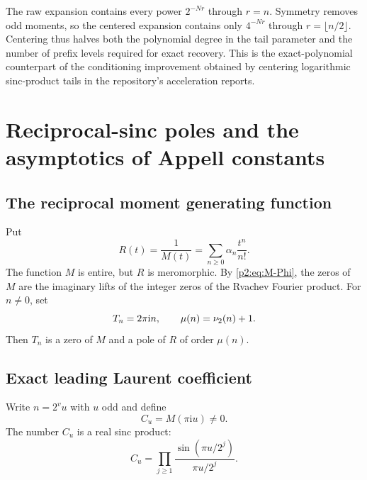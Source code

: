 \documentclass[11pt,oneside]{article}
\numberwithin{equation}{section}
\theoremstyle{definition}
\theoremstyle{remark}
\newcommand{\ii}{\mathrm i}
\begin{document}
\begin{remark}
The raw expansion contains every power $2^{-Nr}$ through $r=n$.  Symmetry removes odd moments,
so the centered expansion contains only $4^{-Nr}$ through $r=\lfloor n/2\rfloor$.  Centering thus
halves both the polynomial degree in the tail parameter and the number of prefix levels required for
exact recovery.  This is the exact-polynomial counterpart of the conditioning improvement obtained
by centering logarithmic sinc-product tails in the repository's acceleration reports.
\end{remark}

\section{Reciprocal-sinc poles and the asymptotics of Appell constants}
\label{p2:sec:poles}

\subsection{The reciprocal moment generating function}

Put
\begin{equation}
 R(t)=\frac1{M(t)}
 =\sum_{n\ge0}\alpha_n\frac{t^n}{n!}.
 \label{p2:eq:R-def}
\end{equation}
The function $M$ is entire, but $R$ is meromorphic.  By \eqref{p2:eq:M-Phi}, the zeros of $M$ are the
imaginary lifts of the integer zeros of the Rvachev Fourier product.  For $n\ne0$, set
\begin{equation}
 T_n=2\pi\ii n,
 \qquad
 \mu(n)=\vtwo(n)+1.
 \label{p2:eq:T-mu}
\end{equation}
Then $T_n$ is a zero of $M$ and a pole of $R$ of order $\mu(n)$.

\subsection{Exact leading Laurent coefficient}

Write $n=2^vu$ with $u$ odd and define
\begin{equation}
 C_u=M(\pi\ii u)\ne0.
 \label{p2:eq:Cu}
\end{equation}
The number $C_u$ is a real sinc product:
\begin{equation}
 C_u=\prod_{j\ge1}\frac{\sin(\pi u/2^j)}{\pi u/2^j}.
 \label{p2:eq:Cu-product}
\end{equation}
\end{document}
